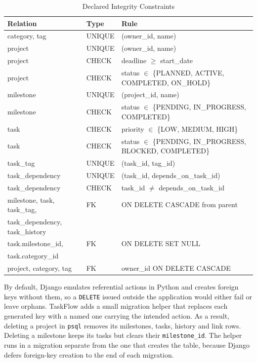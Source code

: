 \documentclass[conference]{IEEEtran}
\begin{document}
\begin{table}[t]
\caption{Declared Integrity Constraints}
\label{tab:constraints}
\centering
\scriptsize
\setlength{\tabcolsep}{3pt}
\begin{tabular}{@{}l l p{4.1cm}@{}}
\toprule
\textbf{Relation} & \textbf{Type} & \textbf{Rule} \\
\midrule
category, tag & UNIQUE & (owner\_id, name) \\
project & UNIQUE & (owner\_id, name) \\
project & CHECK & deadline $\geq$ start\_date \\
project & CHECK & status $\in$ \{PLANNED, ACTIVE, COMPLETED, ON\_HOLD\} \\
milestone & UNIQUE & (project\_id, name) \\
milestone & CHECK & status $\in$ \{PENDING, IN\_PROGRESS, COMPLETED\} \\
task & CHECK & priority $\in$ \{LOW, MEDIUM, HIGH\} \\
task & CHECK & status $\in$ \{PENDING, IN\_PROGRESS, BLOCKED, COMPLETED\} \\
task\_tag & UNIQUE & (task\_id, tag\_id) \\
task\_dependency & UNIQUE & (task\_id, depends\_on\_task\_id) \\
task\_dependency & CHECK & task\_id $\neq$ depends\_on\_task\_id \\
\midrule
milestone, task, task\_tag, & FK & ON DELETE CASCADE from parent \\
\quad task\_dependency, task\_history & & \\
task.milestone\_id, & FK & ON DELETE SET NULL \\
\quad task.category\_id & & \\
project, category, tag & FK & owner\_id ON DELETE CASCADE \\
\bottomrule
\end{tabular}
\end{table}

By default, Django emulates referential actions in Python and creates foreign keys
without them, so a \texttt{DELETE} issued outside the application would either
fail or leave orphans. TaskFlow adds a small migration helper that replaces each
generated key with a named one carrying the intended action. As a result,
deleting a project in \texttt{psql} removes its milestones, tasks, history and
link rows. Deleting a milestone keeps its tasks but clears their
\texttt{milestone\_id}. The helper runs in a migration separate from the one
that creates the table, because Django defers foreign-key creation to the end of
each migration.
\end{document}
